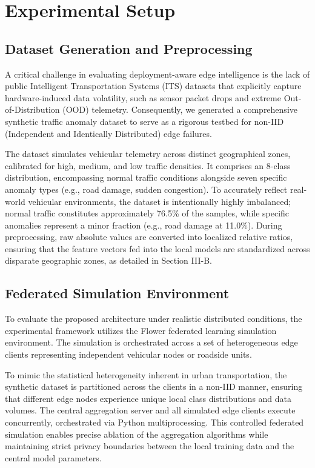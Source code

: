 \section{Experimental Setup}

\subsection{Dataset Generation and Preprocessing}

A critical challenge in evaluating deployment-aware edge intelligence is the lack of public Intelligent Transportation Systems (ITS) datasets that explicitly capture hardware-induced data volatility, such as sensor packet drops and extreme Out-of-Distribution (OOD) telemetry. Consequently, we generated a comprehensive synthetic traffic anomaly dataset to serve as a rigorous testbed for non-IID (Independent and Identically Distributed) edge failures.

The dataset simulates vehicular telemetry across distinct geographical zones, calibrated for high, medium, and low traffic densities. It comprises an 8-class distribution, encompassing normal traffic conditions alongside seven specific anomaly types (e.g., road damage, sudden congestion). To accurately reflect real-world vehicular environments, the dataset is intentionally highly imbalanced; normal traffic constitutes approximately 76.5\% of the samples, while specific anomalies represent a minor fraction (e.g., road damage at 11.0\%). During preprocessing, raw absolute values are converted into localized relative ratios, ensuring that the feature vectors fed into the local models are standardized across disparate geographic zones, as detailed in Section III-B.



\subsection{Federated Simulation Environment}

To evaluate the proposed architecture under realistic distributed conditions, the experimental framework utilizes the Flower federated learning simulation environment. The simulation is orchestrated across a set of heterogeneous edge clients representing independent vehicular nodes or roadside units. 

To mimic the statistical heterogeneity inherent in urban transportation, the synthetic dataset is partitioned across the clients in a non-IID manner, ensuring that different edge nodes experience unique local class distributions and data volumes. The central aggregation server and all simulated edge clients execute concurrently, orchestrated via Python multiprocessing. This controlled federated simulation enables precise ablation of the aggregation algorithms while maintaining strict privacy boundaries between the local training data and the central model parameters.

